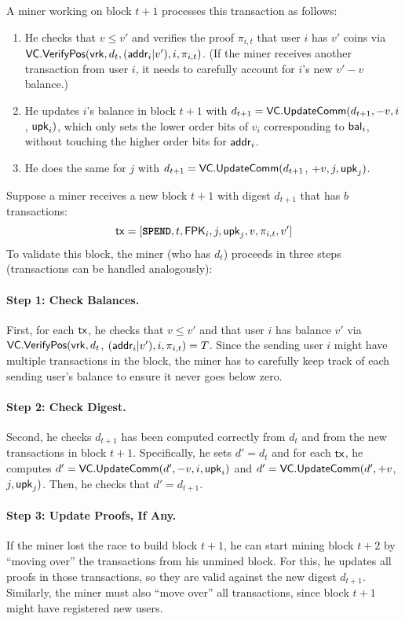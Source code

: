 A miner working on block ${t+1}$ processes this \spendtxn transaction as follows:
\begin{enumerate}
\item He checks that $v\le v'$ and verifies the proof $\pi_{i,t}$ that user $i$ has $v'$ coins via $\mathsf{VC}.\mathsf{VerifyPos}(\mathsf{vrk}, d_t, (\mathsf{addr}_i|v'), i, \pi_{i,t})$.
(If the miner receives another transaction from user $i$, it needs to carefully account for $i$'s new $v'-v$ balance.)
\item He updates $i$'s balance in block $t+1$ with $d_{t+1}=\mathsf{VC}.\mathsf{UpdateComm}(d_{t+1}, -v, i$, $\mathsf{upk}_i)$,
which only sets the lower order bits of $v_i$ corresponding to $\mathsf{bal}_i$, without touching the higher order bits for $\mathsf{addr}_i$.
\item He does the same for $j$ with $d_{t+1}=\mathsf{VC}.\mathsf{UpdateComm}(d_{t+1}$, $+v, j, \mathsf{upk}_j)$.
\end{enumerate}

Suppose a miner receives a new block $t+1$ with digest $d_{t+1}$ that has $b$ \spendtxn transactions:
$$\mathsf{tx}=[\texttt{\textbf{SPEND}}, t, \mathbf{\mathsf{FPK}}_{i}, {j}, \mathsf{upk}_{j}, v, \pi_{i,t}, v']$$
To validate this block, the miner (who has $d_t$) proceeds in three steps (\inittxn transactions can be handled analogously):

\paragraph{Step 1: Check Balances.}
First, for each $\mathsf{tx}$, he checks that $v \le v'$ and that user $i$ has balance $v'$ via $\mathsf{VC}.\mathsf{VerifyPos}(\mathsf{vrk}, d_t$, $(\mathsf{addr}_{i}|v'), i, \pi_{i,t})=T$.
Since the sending user $i$ might have multiple transactions in the block, the miner has to carefully keep track of each sending user's balance to ensure it never goes below zero.

\paragraph{Step 2: Check Digest.}
Second, he checks $d_{t+1}$ has been computed correctly from $d_t$ and from the new transactions in block $t+1$.
Specifically, he sets $d'=d_t$ and for each $\mathsf{tx}$, he computes $d' = \mathsf{VC}.\mathsf{UpdateComm}(d', -v, i, \mathsf{upk}_{i})$ and $d'=\mathsf{VC}.\mathsf{UpdateComm}(d',+v$, $j,\mathsf{upk}_{j})$.
Then, he checks that $d'=d_{t+1}$.

\paragraph{Step 3: Update Proofs, If Any.}
If the miner lost the race to build block $t+1$, he can start mining block $t+2$ by ``moving over'' the \spendtxn transactions from his unmined block.
For this, he updates all proofs in those \spendtxn transactions, so they are valid against the new digest $d_{t+1}$.
Similarly, the miner must also ``move over'' all \inittxn transactions, since block $t+1$ might have registered new users.

